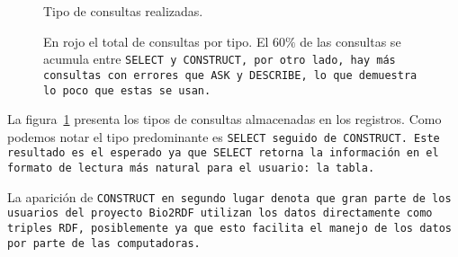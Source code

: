 \begin{figure}[ht]
  \caption{Tipo de consultas realizadas.}\label{fig:qtype}
  \vspace{-.2cm}
  \caption*{\small
    En rojo el total de consultas por tipo. El $60\%$ de las consultas se
    acumula entre \tt{SELECT} y \tt{CONSTRUCT}, por otro lado, hay más consultas
    con errores que \tt{ASK} y \tt{DESCRIBE}, lo que demuestra lo poco que estas
    se usan.
  }
\end{figure}

La figura~\ref{fig:qtype} presenta los tipos de consultas almacenadas en los
registros.
Como podemos notar el tipo predominante es \tt{SELECT} seguido de 
\tt{CONSTRUCT}.
Este resultado es el esperado ya que \tt{SELECT} retorna la información en el
formato de lectura más natural para el usuario: la tabla.


La aparición de \tt{CONSTRUCT} en segundo lugar denota que gran parte de los
usuarios del proyecto Bio2RDF utilizan los datos directamente como  triples RDF,
posiblemente ya que esto facilita el manejo de los datos por parte de las
computadoras.

